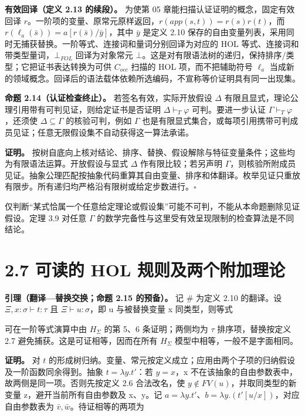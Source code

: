 \documentclass[UTF8,a4paper,zihao=-4,fontset=windows,openany]{ctexbook}
\newcommand{\mcsdisplay}[1]{%
  \par\addvspace{0.7em}%
  \sbox{\mcsmathbox}{\ensuremath{\displaystyle #1}}%
  \ifdim\wd\mcsmathbox>\linewidth
    \noindent\resizebox{\linewidth}{!}{\usebox{\mcsmathbox}}%
  \else
    \noindent\hspace*{\fill}\usebox{\mcsmathbox}\hspace*{\fill}%
  \fi
  \par\addvspace{0.7em}%
}
\def\ensuremath#1{#1}%
\def\operatorname#1{#1}%
\def\mathrm#1{#1}%
\begin{document}
\textbf{有效回译（定义 2.13 的续段）。} 为使第 05 章能扫描认证证明的概念，固定有效回译 \(r\)。一阶项的变量、原常元原样返回，\(r(\operatorname{app}(s,t))=r(s)r(t)\)，而 \(r(\ell_a(\bar s))=a[r(\bar s)/\bar y]\)，其中 \(\bar y\) 是定义 2.10 保存的自由变量列表，采用同时无捕获替换。一阶等式、连接词和量词分别回译为对应的 HOL 等式、连接词和带类型量词，\(\bot_{\mathrm{FOL}}\) 回译为对象常元 \(\bot\)。这是对有限语法树的递归，保持排序/类型；它把证书表达转换为可供 \(C_{\mathrm{occ}}\) 扫描的 HOL 项，而不把辅助符号 \(\ell_a\) 当成新的领域概念。回译后的语法载体依赖所选编码，不宣称等价证明具有同一出现集。

\textbf{命题 2.14（认证检查终止）。} 若签名有效，实际开放假设 \(\Delta\) 有限且显式，理论公理引用带有可判见证，则给定证书是否证明 \(\Delta\vdash_T\varphi\) 可判。要进一步认证 \(\Gamma\vdash_T\varphi\)，还须使 \(\Delta\subseteq\Gamma\) 的核验可判，例如 \(\Gamma\) 也是有限显式集合，或每项引用携带可判成员见证；任意无限假设集不自动获得这一算法承诺。

\textbf{证明。} 按树自底向上核对结论、排序、替换、假设解除与特征变量条件；这些均为有限语法运算。开放假设与显式 \(\Delta\) 作有限比较；若另声明 \(\Gamma\)，则核验所附成员见证。抽象公理匹配按抽象代码重算其自由变量、排序和体翻译。枚举见证只重放有限步。所有递归均严格沿有限树或给定步数进行。\(\square\)

仅判断“某式恰属一个任意给定理论或假设集”可能不可判，不能从本命题删除见证假设。定理 3.9 对任意 \(\Gamma\) 的数学完备性与这里受有效呈现限制的检查算法是不同结论。

\section{2.7 可读的 HOL 规则及两个附加理论}
\textbf{引理（翻译—替换交换；命题 2.15 的预备）。} 记 \(\#\) 为定义 2.10 的翻译。设 \(\Xi,x:\sigma\vdash t:\tau\) 且 \(\Xi\vdash u:\sigma\)，即 u 与被替换变量 x 同类型，则等式


\mcsdisplay{(t[u/x])^{\#}=t^{\#}[u^{\#}/x]}
\noindent 可在一阶等式演算中由 \(H_\Sigma\) 的第 5、6 条证明；两侧均为 \(\tau\) 排序项，替换按定义 2.7 避免捕获。这是可证相等，因而在所有 \(H_\Sigma\) 模型中相等，一般不是字面相同。

\textbf{证明。} 对 \(t\) 的形成树归纳。变量、常元按定义成立；应用由两个子项的归纳假设及一阶函数同余得到。抽象 \(t=\lambda y.t'\)：若 \(y=x\)，x 不在该抽象的自由参数表中，故两侧是同一项。否则先按定义 2.6 合法改名，使 \(y\notin FV(u)\)，并取同类型的新变量 z，避开当前所有自由参数及 x、y。记 \(a=\lambda y.t'\)、\(b=\lambda y.(t'[u/x])\)，对应自由参数表为 \(\bar v,\bar w\)。待证相等的两项为
\end{document}
